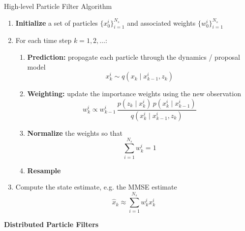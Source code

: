 \documentclass[aspectratio=169]{beamer}
\begin{document}


\begin{frame}[allowframebreaks]{High-level Particle Filter Algorithm}

\begin{enumerate}
    \item \textbf{Initialize} a set of particles $\{x_0^i\}_{i=1}^{N_s}$ and associated weights $\{w_0^i\}_{i=1}^{N_s}$
    
    \vspace{0.2cm}
    
    \item For each time step $k = 1, 2, \dots$:
    \begin{enumerate}
        \item \textbf{Prediction:} propagate each particle through the dynamics / proposal model
        \[
        x_k^i \sim q(x_k \mid x_{k-1}^i, z_k)
        \]
        
        \item \textbf{Weighting:} update the importance weights using the new observation
        \[
        w_k^i \propto w_{k-1}^i \,
        \frac{
        p(z_k \mid x_k^i)\, p(x_k^i \mid x_{k-1}^i)
        }{
        q(x_k^i \mid x_{k-1}^i, z_k)
        }
        \]
        
        \item \textbf{Normalize} the weights so that
        \[
        \sum_{i=1}^{N_s} w_k^i = 1
        \]
        
        \item \textbf{Resample}
    \end{enumerate}
    
    \vspace{0.2cm}
    
    \item Compute the state estimate, e.g. the MMSE estimate
    \[
    \hat{x}_k \approx \sum_{i=1}^{N_s} w_k^i x_k^i
    \]
\end{enumerate}

\end{frame}

\begin{frame}[standout]
	\Huge\textbf{Distributed Particle Filters}
\end{frame}
\end{document}
